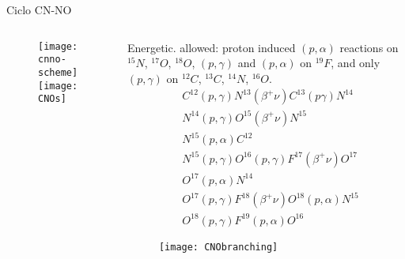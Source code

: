 \begin{frame}{Ciclo CN-NO}
    \begin{columns}[T]
        \begin{column}{0.4\textwidth}
\begin{figure}[!ht]
    \texttt{[image: cnno-scheme]}\label{fig:cnno-scheme}
    \texttt{[image: CNOs]}\label{fig:cnos}
\end{figure}
        \end{column}
        \begin{column}{0.6\textwidth}
            Energetic. allowed: proton induced $(p,\alpha)$ reactions on $^{15}N$, $^{17}O$, $^{18}O$, $(p,\gamma)$ and $(p,\alpha)$ on $^{19}F$, and only $(p,\gamma)$ on $^{12}C$, $^{13}C$, $^{14}N$, $^{16}O$.
            \begin{align*}
                &C^{12}(p,\gamma)N^{13}(\beta^+\nu)C^{13}(p\gamma)N^{14}\tag{CN-CNO1}\\
                &N^{14}(p,\gamma)O^{15}(\beta^+\nu)N^{15}\\
                &N^{15}(p,\alpha)C^{12}\\
                &N^{15}(p,\gamma)O^{16}(p,\gamma)F^{17}(\beta^+\nu)O^{17}\tag{NO-CNO2}\\
                &O^{17}(p,\alpha)N^{14}\\
                &O^{17}(p,\gamma)F^{18}(\beta^+\nu)O^{18}(p,\alpha)N^{15}\tag{CNO3}\\
                &O^{18}(p,\gamma)F^{19}(p,\alpha)O^{16}\tag{CNO4}
            \end{align*}
\begin{figure}[!ht]
    \texttt{[image: CNObranching]}\label{fig:CNObranching}
\end{figure}
        \end{column}
    \end{columns}
\end{frame}

